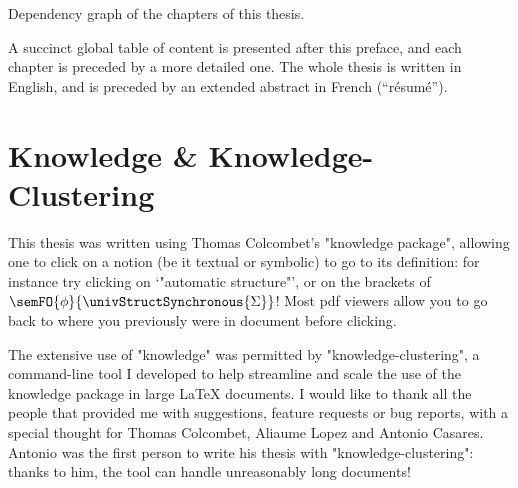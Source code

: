 \begin{marginfigure}
	\centering
	\caption{\AP\label{fig:chapter-dependency-graph}
		Dependency graph of the chapters of this thesis.}
\end{marginfigure}
A succinct global table of content is presented after this preface,
and each chapter is preceded by a more detailed one.
The whole thesis is written in English, and is preceded by an extended abstract in French (``résumé'').

\section*{Knowledge \& Knowledge-Clustering}
This thesis was written using Thomas Colcombet's "knowledge package", allowing
one to click on a notion (be it textual or symbolic) to go to its definition:
for instance try clicking on `"automatic structure"', or on the brackets of
$\semFO{\phi}{\univStructSynchronous{\Sigma}}$!
Most pdf viewers allow you to go back to where you previously were
in document before clicking.

The extensive use of "knowledge" was permitted by "knowledge-clustering",
a command-line tool I developed to help streamline and scale the use
of the knowledge package in large LaTeX documents.
I would like to thank all the people that provided me with suggestions,
feature requests or bug reports, with a special thought for Thomas Colcombet, Aliaume Lopez
and Antonio Casares. Antonio was the first person to write his thesis
with "knowledge-clustering": thanks to him, the tool can handle
unreasonably long documents!

